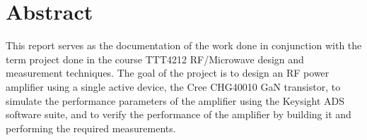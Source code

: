 \chapter{Abstract}
This report serves as the documentation of the work done in conjunction with the term project done in the course TTT4212 RF/Microwave design and measurement techniques. The goal of the project is to design an RF power amplifier using a single active device, the Cree CHG40010 GaN transistor, to simulate the performance parameters of the amplifier using the Keysight ADS software suite, and to verify the performance of the amplifier by building it and performing the required measurements.

